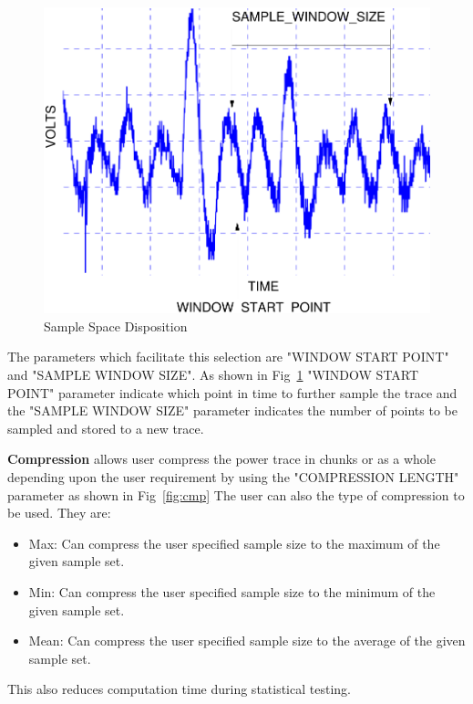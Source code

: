 \documentclass{llncs}
\numberwithin{algorithm}{chapter}
\begin{document}
\begin{figure}[ht]
\begin{center}
\includegraphics[scale=0.6]{figures/sampleSpaceDisp}
\caption{\label{fig:ssd}Sample Space Disposition}
\end{center} 
\vspace{-3ex}
\end{figure}

The parameters which facilitate this selection are "WINDOW START POINT" and "SAMPLE WINDOW SIZE". As shown in
Fig~\ref{fig:ssd} "WINDOW START POINT" parameter indicate which point in time to further sample the trace and the
"SAMPLE WINDOW SIZE" parameter indicates the number of points to be sampled and stored to a new trace.

\textbf{Compression} allows user compress the power trace in chunks or as a whole
depending upon the user requirement by using the "COMPRESSION LENGTH" parameter as shown in Fig~\ref{fig:cmp}
The user can also the type of compression to be used. They are:
\begin{itemize}
\item Max: Can compress the user specified sample size to the maximum of the given sample set.
\item Min: Can compress the user specified sample size to the minimum of the given sample set.
\item Mean: Can compress the user specified sample size to the average of the given sample set.
\end{itemize}

This also reduces computation time during statistical testing.
\end{document}
